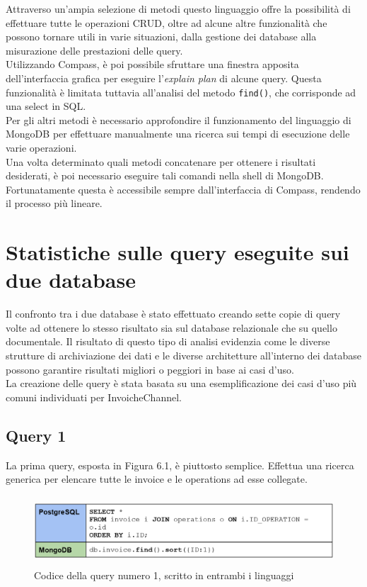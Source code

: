 \noindent Attraverso un'ampia selezione di metodi questo linguaggio offre la possibilità di effettuare tutte le \gls{operazioni CRUD}, oltre ad alcune altre funzionalità che possono tornare utili in varie situazioni, dalla gestione dei database alla misurazione delle prestazioni delle query.\\
Utilizzando Compass, è poi possibile sfruttare una finestra apposita dell'interfaccia grafica per eseguire l'\textit{explain plan} di alcune query. Questa funzionalità è limitata tuttavia all'analisi del metodo \texttt{find()}, che corrisponde ad una select in \gls{SQL}.\\
Per gli altri metodi è necessario approfondire il funzionamento del linguaggio di MongoDB per effettuare manualmente una ricerca sui tempi di esecuzione delle varie operazioni.\\
Una volta determinato quali metodi concatenare per ottenere i risultati desiderati, è poi necessario eseguire tali comandi nella shell di MongoDB. Fortunatamente questa è accessibile sempre dall'interfaccia di Compass, rendendo il processo più lineare.\\


\section{Statistiche sulle query eseguite sui due database}
Il confronto tra i due database è stato effettuato creando sette copie di query volte ad ottenere lo stesso risultato sia sul database relazionale che su quello documentale. Il risultato di questo tipo di analisi evidenzia come le diverse strutture di archiviazione dei dati e le diverse architetture all'interno dei database possono garantire risultati migliori o peggiori in base ai casi d'uso.\\
La creazione delle query è stata basata su una esemplificazione dei casi d'uso più comuni individuati per InvoicheChannel.

\subsection{Query 1}
La prima query, esposta in Figura 6.1, è piuttosto semplice. Effettua una ricerca generica per elencare tutte le invoice e le operations ad esse collegate.\\

\begin{figure}[htbp]
\begin{center}
\includegraphics[height=7em]{immagini/query/query1.png}
\caption{Codice della query numero 1, scritto in entrambi i linguaggi}
\end{center}
\end{figure}

